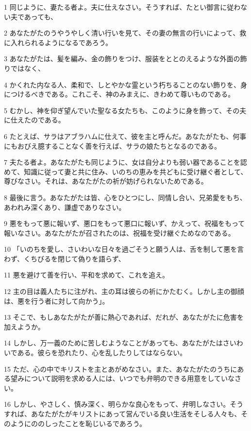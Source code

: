 \par 1 同じように、妻たる者よ。夫に仕えなさい。そうすれば、たとい御言に従わない夫であっても、
\par 2 あなたがたのうやうやしく清い行いを見て、その妻の無言の行いによって、救に入れられるようになるであろう。
\par 3 あなたがたは、髪を編み、金の飾りをつけ、服装をととのえるような外面の飾りではなく、
\par 4 かくれた内なる人、柔和で、しとやかな霊という朽ちることのない飾りを、身につけるべきである。これこそ、神のみまえに、きわめて尊いものである。
\par 5 むかし、神を仰ぎ望んでいた聖なる女たちも、このように身を飾って、その夫に仕えたのである。
\par 6 たとえば、サラはアブラハムに仕えて、彼を主と呼んだ。あなたがたも、何事にもおびえ臆することなく善を行えば、サラの娘たちとなるのである。
\par 7 夫たる者よ。あなたがたも同じように、女は自分よりも弱い器であることを認めて、知識に従って妻と共に住み、いのちの恵みを共どもに受け継ぐ者として、尊びなさい。それは、あなたがたの祈が妨げられないためである。
\par 8 最後に言う。あなたがたは皆、心をひとつにし、同情し合い、兄弟愛をもち、あわれみ深くあり、謙虚でありなさい。
\par 9 悪をもって悪に報いず、悪口をもって悪口に報いず、かえって、祝福をもって報いなさい。あなたがたが召されたのは、祝福を受け継ぐためなのである。
\par 10 「いのちを愛し、さいわいな日々を過ごそうと願う人は、舌を制して悪を言わず、くちびるを閉じて偽りを語らず、
\par 11 悪を避けて善を行い、平和を求めて、これを追え。
\par 12 主の目は義人たちに注がれ、主の耳は彼らの祈にかたむく。しかし主の御顔は、悪を行う者に対して向かう」。
\par 13 そこで、もしあなたがたが善に熱心であれば、だれが、あなたがたに危害を加えようか。
\par 14 しかし、万一義のために苦しむようなことがあっても、あなたがたはさいわいである。彼らを恐れたり、心を乱したりしてはならない。
\par 15 ただ、心の中でキリストを主とあがめなさい。また、あなたがたのうちにある望みについて説明を求める人には、いつでも弁明のできる用意をしていなさい。
\par 16 しかし、やさしく、慎み深く、明らかな良心をもって、弁明しなさい。そうすれば、あなたがたがキリストにあって営んでいる良い生活をそしる人々も、そのようにののしったことを恥じいるであろう。
